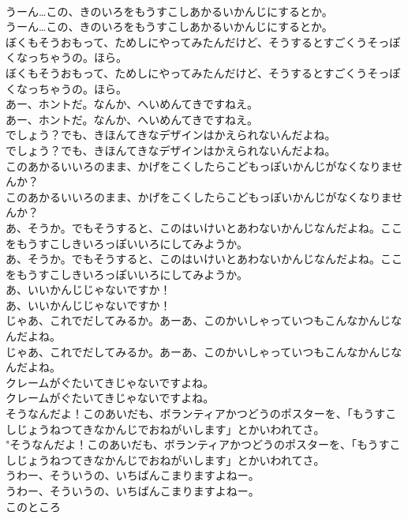 \documentclass[8pt]{extreport}
\begin{document}
\begin{CJK}{UTF8}{min}
\\	うーん…この、きのいろをもうすこしあかるいかんじにするとか。	
\\	うーん…この、きのいろをもうすこしあかるいかんじにするとか。 
\\	ぼくもそうおもって、ためしにやってみたんだけど、そうするとすごくうそっぽくなっちゃうの。ほら。	
\\	ぼくもそうおもって、ためしにやってみたんだけど、そうするとすごくうそっぽくなっちゃうの。ほら。 
\\	あー、ホントだ。なんか、へいめんてきですねえ。	
\\	あー、ホントだ。なんか、へいめんてきですねえ。 
\\	でしょう？でも、きほんてきなデザインはかえられないんだよね。	
\\	でしょう？でも、きほんてきなデザインはかえられないんだよね。 
\\	このあかるいいろのまま、かげをこくしたらこどもっぽいかんじがなくなりませんか？	
\\	このあかるいいろのまま、かげをこくしたらこどもっぽいかんじがなくなりませんか？ 
\\	あ、そうか。でもそうすると、このはいけいとあわないかんじなんだよね。ここをもうすこしきいろっぽいいろにしてみようか。	
\\	あ、そうか。でもそうすると、このはいけいとあわないかんじなんだよね。ここをもうすこしきいろっぽいいろにしてみようか。 
\\	あ、いいかんじじゃないですか！	
\\	あ、いいかんじじゃないですか！ 
\\	じゃあ、これでだしてみるか。あーあ、このかいしゃっていつもこんなかんじなんだよね。	
\\	じゃあ、これでだしてみるか。あーあ、このかいしゃっていつもこんなかんじなんだよね。 
\\	クレームがぐたいてきじゃないですよね。	
\\	クレームがぐたいてきじゃないですよね。 
\\	そうなんだよ！このあいだも、ボランティアかつどうのポスターを、「もうすこしじょうねつてきなかんじでおねがいします」とかいわれてさ。	
\\	"そうなんだよ！このあいだも、ボランティアかつどうのポスターを、「もうすこしじょうねつてきなかんじでおねがいします」とかいわれてさ。 
\\	うわー、そういうの、いちばんこまりますよねー。	
\\	うわー、そういうの、いちばんこまりますよねー。 
\\	このところ

\end{CJK}
\end{document}
